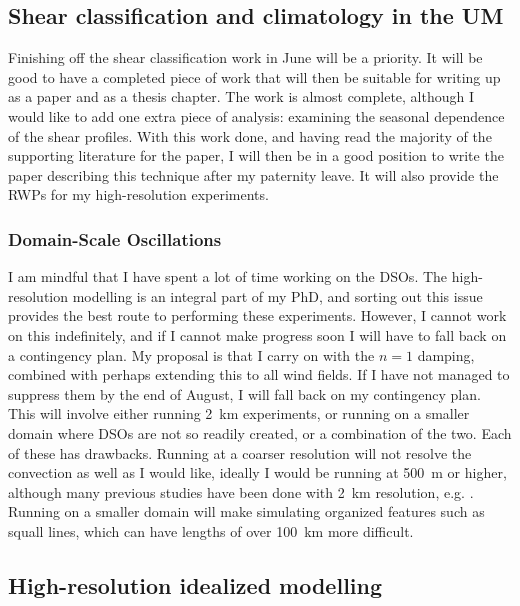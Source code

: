 \documentclass[11pt,a4paper]{article}
\begin{document}
\subsection{Shear classification and climatology in the UM}
\label{sec:Shear climatology in the UM}
Finishing off the shear classification work in June will be a priority. It will be good to have a completed piece of work that will then be suitable for writing up as a paper and as a thesis chapter. The work is almost complete, although I would like to add one extra piece of analysis: examining the seasonal dependence of the shear profiles. With this work done, and having read the majority of the supporting literature for the paper, I will then be in a good position to write the paper describing this technique after my paternity leave. It will also provide the RWPs for my high-resolution experiments.

\subsubsection{Domain-Scale Oscillations}
\label{sec:dso}
I am mindful that I have spent a lot of time working on the DSOs. The high-resolution modelling is an integral part of my PhD, and sorting out this issue provides the best route to performing these experiments. However, I cannot work on this indefinitely, and if I cannot make progress soon I will have to fall back on a contingency plan. My proposal is that I carry on with the $n = 1$ damping, combined with perhaps extending this to all wind fields. If I have not managed to suppress them by the end of August, I will fall back on my contingency plan. This will involve either running \SI{2}{km} experiments, or running on a smaller domain where DSOs are not so readily created, or a combination of the two. Each of these has drawbacks. Running at a coarser resolution will not resolve the convection as well as I would like, ideally I would be running at \SI{500}{m} or higher, although many previous studies have been done with \SI{2}{km} resolution, e.g. \cite{tompkins2017organization}. Running on a smaller domain will make simulating organized features such as squall lines, which can have lengths of over \SI{100}{km} more difficult.

\subsection{High-resolution idealized modelling}
\label{sec:High-resolution idealized modelling}
\end{document}
